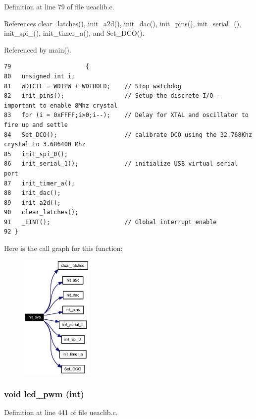 Definition at line 79 of file ueaclib.c.

References clear\_\-latches(), init\_\-a2d(), init\_\-dac(), init\_\-pins(), init\_\-serial\_(), init\_\-spi\_(), init\_\-timer\_\-a(), and Set\_\-DCO().

Referenced by main().

\footnotesize\begin{verbatim}79                     {
80   unsigned int i;
81   WDTCTL = WDTPW + WDTHOLD;    // Stop watchdog
82   init_pins();                 // Setup the discrete I/O - important to enable 8Mhz crystal 
83   for (i = 0xFFFF;i>0;i--);    // Delay for XTAL and oscillator to fire up and settle
84   Set_DCO();                   // calibrate DCO using the 32.768Khz crystal to 3.686400 Mhz  
85   init_spi_0();
86   init_serial_1();             // initialize USB virtual serial port
87   init_timer_a();              
88   init_dac();
89   init_a2d();
90   clear_latches();
91   _EINT();                     // Global interrupt enable
92 }
\end{verbatim}\normalsize 




Here is the call graph for this function:\begin{figure}[H]
\begin{center}
\leavevmode
\includegraphics[width=99pt]{ueaclib_8h_a6_cgraph}
\end{center}
\end{figure}
\subsubsection{\setlength{\rightskip}{0pt plus 5cm}void led\_\-pwm (int)}\label{ueaclib_8h_a20}




Definition at line 441 of file ueaclib.c.

